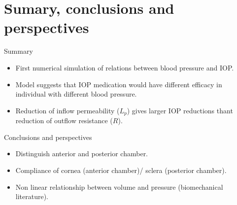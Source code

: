 \section{Sumary, conclusions and perspectives}
\begin{frame}{Summary}
\begin{itemize}
\item First numerical simulation of relations between blood pressure and IOP.
\item Model suggests that IOP medication would have different efficacy in individual with different blood pressure.
\item Reduction of inflow permeability ($L_p$) gives larger IOP reductions thant reduction of outflow resistance ($R$).
\end{itemize}
\end{frame}
\begin{frame}{Conclusions and perspectives}
\begin{itemize}
\item Distinguish anterior and posterior chamber.

\item Compliance of cornea (anterior chamber)/ sclera (posterior chamber).

\item<2>{Non linear relationship between volume and pressure (biomechanical literature).}
\end{itemize}


\end{frame}
